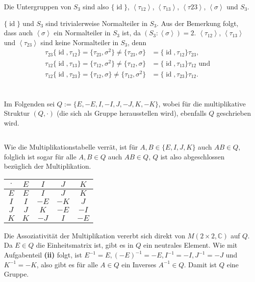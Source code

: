 \documentclass[a4paper,10pt]{article}
\theoremstyle{definition}
\newcommand{\C}{\mathbb{C}}
\newcommand{\id}{\operatorname{id}}
\newcommand{\gen}[1]{\left\langle#1\right\rangle}
\begin{document}
Die Untergruppen von $S_3$ sind also $\{\id\}$, $\gen{\tau_{12}}$, $\gen{\tau_{13}}$, $\gen{\tau{23}}$, $\gen{\sigma}$ und $S_3$.

$\{\id\}$ und $S_3$ sind trivialerweise Normalteiler in $S_3$. Aus der Bemerkung folgt, dass auch $\gen{\sigma}$ ein Normalteiler in $S_3$ ist, da $(S_3 : \gen{\sigma}) = 2$. $\gen{\tau_{12}}$, $\gen{\tau_{13}}$ und $\gen{\tau_{23}}$ sind keine Normalteiler in $S_3$, denn
\begin{align*}
 \tau_{23} \{ \id, \tau_{12}\}
 = \{ \tau_{23}, \sigma^2 \}
 \neq \{ \tau_{23}, \sigma \}
 &= \{\id, \tau_{12}\} \tau_{23},\\
 \tau_{12} \{ \id, \tau_{13}\}
 = \{ \tau_{12}, \sigma^2 \}
 \neq \{ \tau_{12}, \sigma \}
 &= \{ \id, \tau_{13} \} \tau_{12} \text{ und}\\
 \tau_{12} \{ \id, \tau_{23} \}
 = \{ \tau_{12}, \sigma \}
 \neq  \{ \tau_{12}, \sigma^2 \}
 &= \{ \id, \tau_{23} \} \tau_{12}.
\end{align*}





\section{}
Im Folgenden sei $Q := \{E,-E,I,-I,J,-J,K,-K\}$, wobei für die multiplikative Struktur $(Q,\cdot)$ (die sich als Gruppe herausstellen wird), ebenfalls $Q$ geschrieben wird.

\subsection{}
Wie die Multiplikationstabelle verrät, ist für $A,B \in \{E, I, J, K\}$ auch $AB \in Q$, folglich ist sogar für alle $A,B \in Q$ auch $AB \in Q$, $Q$ ist also abgeschlossen bezüglich der Multiplikation.
\begin{center}
 \begin{tabular}{c|cccc} 
  $\cdot$ & $E$ & $ I$ & $ J$ & $ K$  \\\hline 
      $E$ & $E$ & $ I$ & $ J$ & $ K$  \\ 
      $I$ & $I$ & $-E$ & $-K$ & $ J$  \\
      $J$ & $J$ & $ K$ & $-E$ & $-I$ \\
      $K$ & $K$ & $-J$ & $ I$ & $-E$
 \end{tabular}
\end{center}
Die Assoziativität der Multiplikation vererbt sich direkt von $M(2 \times 2, \C)$ auf $Q$.
Da $E \in Q$ die Einheitsmatrix ist, gibt es in $Q$ ein neutrales Element. Wie mit Aufgabenteil \textbf{(ii)} folgt, ist $E^{-1} = E, (-E)^{-1} = -E, I^{-1} = -I, J^{-1} = -J$ und $K^{-1} = -K$, also gibt es für alle $A \in Q$ ein Inverses $A^{-1} \in Q$. Damit ist $Q$ eine Gruppe.
\end{document}
